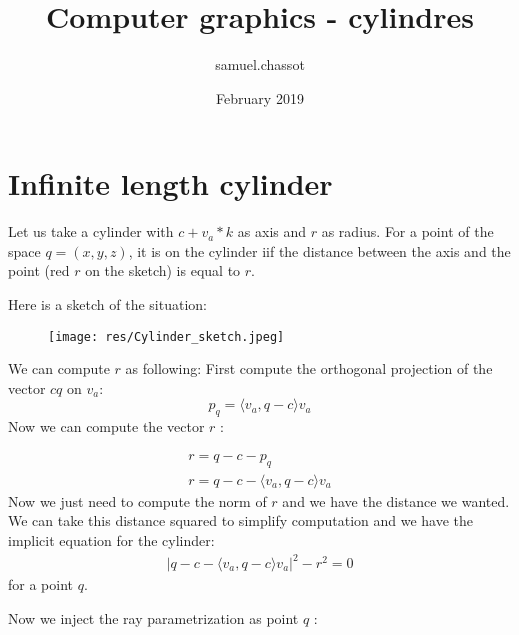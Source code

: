 \documentclass{article}
\title{Computer graphics - cylindres}
\author{samuel.chassot }
\date{February 2019}
\begin{document}
\maketitle

\section{Infinite length cylinder}
Let us take a cylinder with $c + v_a*k$ as axis and $r$ as radius. For a point of the space $q = (x,y,z)$, it is on the cylinder iif the distance between the axis and the point (red $r$ on the sketch) is equal to $r$.

Here is a sketch of the situation:
\begin{figure}[h]
\centering
\texttt{[image: res/Cylinder\_sketch.jpeg]}
\end{figure}

We can compute $r$ as following:
First compute the orthogonal projection of the vector $c q$ on $v_a$:
$$p_q = \langle v_a, q-c\rangle  v_a$$
Now we can compute the vector $r$ :

\begin{gather*}
    r = q-c-p_q \\
    r = q-c - \langle v_a, q-c\rangle  v_a
\end{gather*}
Now we just need to compute the norm of $r$ and we have the distance we wanted. We can take this distance squared to simplify computation and we have the implicit equation for the cylinder:
\begin{gather*}
    |q-c-\langle v_a, q-c\rangle  v_a|^2 -r^2 = 0
\end{gather*}
for a point $q$.

Now we inject the ray parametrization as point $q$ :
\end{document}
